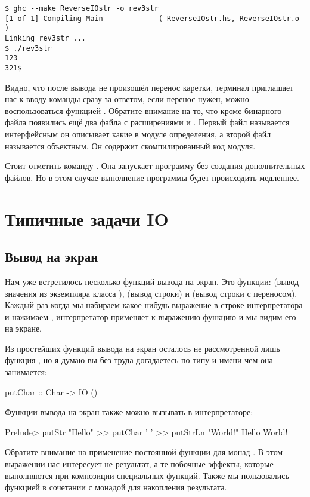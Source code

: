 \begin{verbatim}
$ ghc --make ReverseIOstr -o rev3str
[1 of 1] Compiling Main             ( ReverseIOstr.hs, ReverseIOstr.o )
Linking rev3str ...
$ ./rev3str 
123
321$
\end{verbatim}

Видно, что после вывода не произошёл перенос каретки, терминал
приглашает нас к вводу команды сразу за ответом, если перенос нужен,
можно воспользоваться функцией . Обратите внимание на то,
что кроме бинарного файла появились ещё два файла с расширениями
 и . Первый файл называется интерфейсным он описывает
какие в модуле определения, а второй файл называется объектным. Он
содержит скомпилированный код модуля.

Стоит отметить команду . Она запускает программу без
создания дополнительных файлов. Но в этом случае выполнение программы
будет происходить медленнее.

\section{Типичные задачи IO}

\subsection{Вывод на экран}

Нам уже встретилось несколько функций вывода на экран. Это функции:
 (вывод значения из экземпляра класса ), 
(вывод строки) и  (вывод строки с переносом). Каждый раз
когда мы набираем какое-нибудь выражение в строке интерпретатора и
нажимаем , интерпретатор применяет к выражению функцию
 и мы видим его на экране.

Из простейших функций вывода на экран осталось не рассмотренной лишь
функция , но я думаю вы без труда догадаетесь по типу и
имени чем она занимается:


\begin{code}
putChar :: Char -> IO ()
\end{code}

Функции вывода на экран также можно вызывать в интерпретаторе:


\begin{code}
Prelude> putStr "Hello" >> putChar ' ' >> putStrLn "World!" 
Hello World!
\end{code}

Обратите внимание на применение постоянной функции для монад \In{>>}. В
этом выражении нас интересует не результат, а те побочные эффекты,
которые выполняются при композиции специальных функций. Также мы
пользовались функцией \In{>>} в сочетании с монадой  для
накопления результата.

